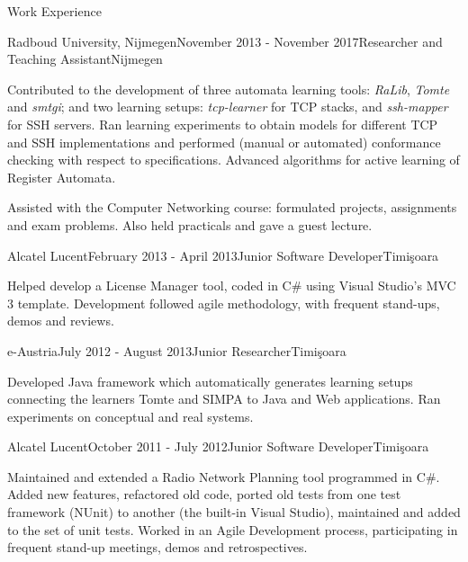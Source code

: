\documentclass{resume} %
\newcommand{\plang}[1]{$($#1$)$}
\renewcommand{\plang}[1]{}
\begin{document}

\begin{rSection}{Work Experience}
\item \begin{rSubsection}{Radboud University, Nijmegen}{November 2013 - November 2017}{Researcher and Teaching Assistant}{Nijmegen}
\item Contributed to the development of three automata learning tools: \emph{RaLib}\plang{Java}, \emph{Tomte}\plang{Java, Python} and \emph{smtgi}\plang{Python}; and
two learning setups: \emph{tcp-learner}\plang{Java, Python} for TCP stacks, and \emph{ssh-mapper}\plang{Java, Python} for SSH servers. Ran learning experiments to obtain models for different TCP and SSH implementations and performed (manual or automated) conformance checking with respect to specifications. Advanced algorithms for active learning of Register Automata.
\item Assisted with the Computer Networking course: formulated projects, assignments and exam problems. Also held practicals and gave a guest lecture.
\end{rSubsection}



\begin{rSubsection}{Alcatel Lucent}{February 2013 - April 2013}{Junior Software Developer}{Timi\c{s}oara}
\item Helped develop a License Manager tool, coded in C\# using Visual Studio's MVC 3 template. Development followed agile methodology, with frequent stand-ups, demos and reviews.
\end{rSubsection}



\begin{rSubsection}{e-Austria}{July 2012 - August 2013}{Junior Researcher}{Timi\c{s}oara}
\item Developed Java framework which automatically generates learning setups connecting the learners Tomte and SIMPA to Java and Web applications. Ran experiments on conceptual and real systems.
\end{rSubsection}



\begin{rSubsection}{Alcatel Lucent}{October 2011 - July 2012}{Junior Software Developer}{Timi\c{s}oara}
\item Maintained and extended a Radio Network Planning tool programmed in C\#. Added new features, refactored old code, ported old tests from one test framework (NUnit) to another (the built-in Visual Studio), maintained and added to the set of unit tests. Worked in an Agile Development process, participating in frequent stand-up meetings, demos and retrospectives.
\end{rSubsection}
\end{rSection}
\end{document}
